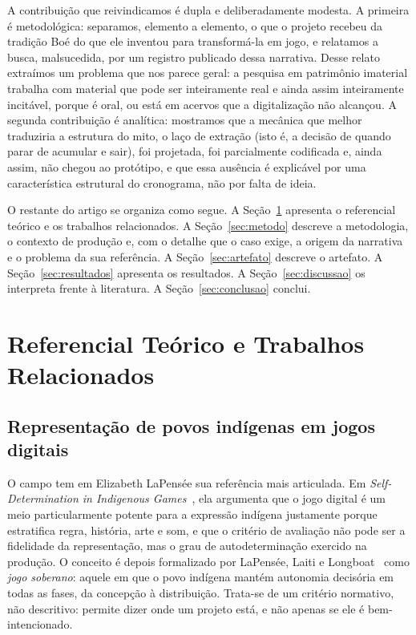 \documentclass[conference]{IEEEtran}
\begin{document}
A contribuição que reivindicamos é dupla e deliberadamente modesta. A primeira é
metodológica: separamos, elemento a elemento, o que o projeto recebeu da tradição Boé do
que ele inventou para transformá-la em jogo, e relatamos a busca, malsucedida, por um
registro publicado dessa narrativa. Desse relato extraímos um problema que nos parece
geral: a pesquisa em patrimônio imaterial trabalha com material que pode ser inteiramente
real e ainda assim inteiramente incitável, porque é oral, ou está em acervos que a
digitalização não alcançou. A segunda
contribuição é analítica: mostramos que a mecânica que melhor traduziria a estrutura do
mito, o laço de extração (isto é, a decisão de quando parar de acumular e sair), foi
projetada, foi parcialmente codificada e, ainda assim, não chegou ao protótipo, e que
essa ausência é explicável por uma característica estrutural do cronograma, não por
falta de ideia.

O restante do artigo se organiza como segue. A Seção~\ref{sec:referencial} apresenta o
referencial teórico e os trabalhos relacionados. A Seção~\ref{sec:metodo} descreve a
metodologia, o contexto de produção e, com o detalhe que o caso exige, a origem da
narrativa e o problema da sua referência. A Seção~\ref{sec:artefato} descreve o artefato. A
Seção~\ref{sec:resultados} apresenta os resultados. A Seção~\ref{sec:discussao} os
interpreta frente à literatura. A Seção~\ref{sec:conclusao} conclui.

\section{Referencial Teórico e Trabalhos Relacionados}
\label{sec:referencial}

\subsection{Representação de povos indígenas em jogos digitais}

O campo tem em Elizabeth LaPensée sua referência mais articulada. Em
\textit{Self-Determination in Indigenous Games}~\cite{lapensee2018}, ela argumenta que o
jogo digital é um meio particularmente potente para a expressão indígena justamente
porque estratifica regra, história, arte e som, e que o critério de avaliação não pode
ser a fidelidade da representação, mas o grau de autodeterminação exercido na produção.
O conceito é depois formalizado por LaPensée, Laiti e Longboat~\cite{lapensee2022} como
\textit{jogo soberano}: aquele em que o povo indígena mantém autonomia decisória em
todas as fases, da concepção à distribuição. Trata-se de um critério normativo, não
descritivo: permite dizer onde um projeto está, e não apenas se ele é bem-intencionado.
\end{document}
